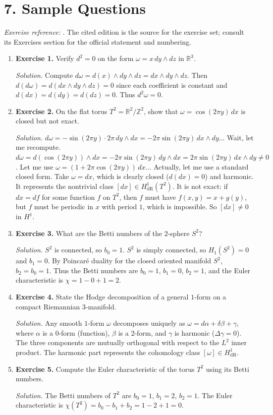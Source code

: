 \section*{7. Sample Questions}
\emph{Exercise reference:} \cite{hodge_theory_ref1}. The cited edition is the source for the exercise set; consult its Exercises section for the official statement and numbering.
\begin{enumerate}[leftmargin=*,itemsep=0.9em]
\item \textbf{Exercise 1.} Verify $d^2=0$ on the form $\omega=x\,dy\wedge dz$ in $\mathbb{R}^3$.

\emph{Solution.} Compute $d\omega=d(x)\wedge dy\wedge dz=dx\wedge dy\wedge dz$. Then $d(d\omega)=d(dx\wedge dy\wedge dz)=0$ since each coefficient is constant and $d(dx)=d(dy)=d(dz)=0$. Thus $d^2\omega=0$.

\item \textbf{Exercise 2.} On the flat torus $T^2=\mathbb{R}^2/\mathbb{Z}^2$, show that $\omega=\cos(2\pi y)\,dx$ is closed but not exact.

\emph{Solution.} $d\omega=-\sin(2\pi y)\cdot 2\pi\,dy\wedge dx=-2\pi\sin(2\pi y)\,dx\wedge dy$... Wait, let me recompute. $d\omega=d(\cos(2\pi y))\wedge dx=-2\pi\sin(2\pi y)\,dy\wedge dx=2\pi\sin(2\pi y)\,dx\wedge dy\neq 0$. Let me use $\omega=(1+2\pi\cos(2\pi y))\,dx$... Actually, let me use a standard closed form. Take $\omega=dx$, which is clearly closed ($d(dx)=0$) and harmonic. It represents the nontrivial class $[dx]\in H^1_{\mathrm{dR}}(T^2)$. It is not exact: if $dx=df$ for some function $f$ on $T^2$, then $f$ must have $f(x,y)=x+g(y)$, but $f$ must be periodic in $x$ with period $1$, which is impossible. So $[dx]\neq 0$ in $H^1$.

\item \textbf{Exercise 3.} What are the Betti numbers of the $2$-sphere $S^2$?

\emph{Solution.} $S^2$ is connected, so $b_0=1$. $S^2$ is simply connected, so $H_1(S^2)=0$ and $b_1=0$. By Poincar\'{e} duality for the closed oriented manifold $S^2$, $b_2=b_0=1$. Thus the Betti numbers are $b_0=1$, $b_1=0$, $b_2=1$, and the Euler characteristic is $\chi=1-0+1=2$.

\item \textbf{Exercise 4.} State the Hodge decomposition of a general $1$-form on a compact Riemannian $3$-manifold.

\emph{Solution.} Any smooth $1$-form $\omega$ decomposes uniquely as $\omega=d\alpha+\delta\beta+\gamma$, where $\alpha$ is a $0$-form (function), $\beta$ is a $2$-form, and $\gamma$ is harmonic ($\Delta\gamma=0$). The three components are mutually orthogonal with respect to the $L^2$ inner product. The harmonic part represents the cohomology class $[\omega]\in H^1_{\mathrm{dR}}$.

\item \textbf{Exercise 5.} Compute the Euler characteristic of the torus $T^2$ using its Betti numbers.

\emph{Solution.} The Betti numbers of $T^2$ are $b_0=1$, $b_1=2$, $b_2=1$. The Euler characteristic is $\chi(T^2)=b_0-b_1+b_2=1-2+1=0$.

\end{enumerate}
